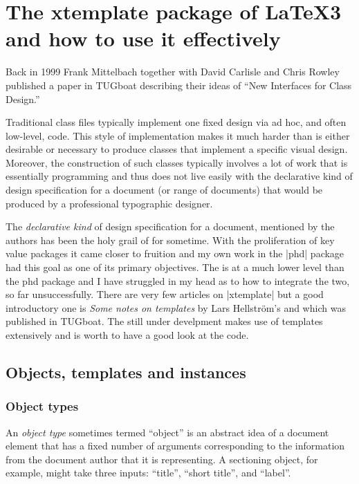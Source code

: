 \chapter{The xtemplate package of LaTeX3 and how to use it effectively}

Back in 1999 Frank Mittelbach together with David Carlisle and Chris Rowley published a paper in TUGboat describing their ideas of  \enquote{New Interfaces for \latex Class Design.} 
 
 \begin{latexquote}
 Traditional \latex class files typically implement one
fixed design via ad hoc, and often low-level, \latex
code. This style of implementation makes it much
harder than is either desirable or necessary to produce
classes that implement a specific visual design.
Moreover, the construction of such classes typically
involves a lot of work that is essentially programming
and thus does not live easily with the declarative
kind of design specification for a document (or
range of documents) that would be produced by a
professional typographic designer.
\end{latexquote}

The \emph{declarative kind} of design specification for a document, mentioned by the authors has been the holy grail of \latex for sometime. With the proliferation of key value packages it came closer to fruition and my own work in the |phd| package had this goal as one of its primary objectives. The  is at a much lower level than the phd package and I have struggled in my head as to how to integrate the two, so far unsuccessfully. There are very few articles on |xtemplate| but a good introductory one is \emph{Some notes on templates} by  Lars Hellström’s and which was published in TUGboat. The  still under develpment makes use of templates extensively and is worth to have a good look at the code.

\section{Objects, templates and instances}

\subsection{Object types}

An \emph{object type} sometimes termed \enquote{object} is an abstract idea of a document element that has a fixed number of arguments corresponding to the information from the document author that it is representing.  A sectioning object, for example, might take three inputs: \enquote{title}, \enquote{short title}, and \enquote{label}.

